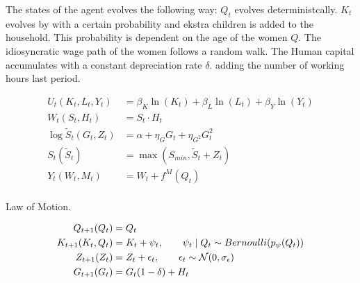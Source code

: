 The states of the agent evolves the following way: $Q_t$ evolves deterministcally. $K_t$ evolves by with a certain probability and ekstra children is added to the household. This probability is dependent on the age of the women $Q$. The idiosyncratic wage path of the women follows a random walk. The Human capital accumulates with a constant depreciation rate $\delta$. adding the number of working hours last period.

\begin{align}
    U_t(K_t, L_t, Y_t) &= \beta_K \ln(K_t) + \beta_L \ln(L_t) + \beta_Y \ln(Y_t) \label{eq:utility_v1}\\
    W_t(S_t, H_t) &= S_t \cdot H_t \\
    \log \tilde{S}_t (G_t, Z_t) &= \alpha + \eta_G G_t + \eta_{G^2} G_t^2 \\
    S_t(\tilde{S}_t) &= \max(S_{min} , \tilde{S}_t  + Z_t)  \\
    Y_t(W_t, M_t) &= W_t + f^M(Q_t)\\
\end{align}


Law of Motion.

\begin{align}
    Q_{t+1}(Q_t) &= Q_t \\
    K_{t+1}(K_t, Q_t)  &= K_{t} + \psi_t, \qquad \psi_t \mid Q_t \sim Bernoulli(p_\psi(Q_t)) \\
    Z_{t+1}(Z_t) &= Z_t + \epsilon_t, \qquad \epsilon_t \sim \mathcal{N}(0, \sigma_\epsilon) \\
    G_{t+1}(G_t) &= G_t(1 - \delta) + H_t \\
\end{align}



